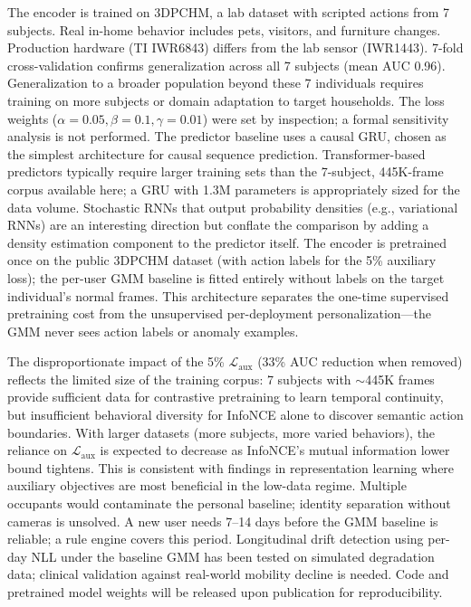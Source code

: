 \documentclass[11pt,a4paper]{article}
\begin{document}
The encoder is trained on 3DPCHM, a lab dataset with scripted actions from 7 subjects. Real in-home behavior includes pets, visitors, and furniture changes. Production hardware (TI IWR6843) differs from the lab sensor (IWR1443).
7-fold cross-validation confirms generalization across all 7 subjects (mean AUC 0.96).
Generalization to a broader population beyond these 7 individuals requires training on more subjects or domain adaptation to target households.
The loss weights ($\alpha{=}0.05, \beta{=}0.1, \gamma{=}0.01$) were set by inspection; a formal sensitivity analysis is not performed.
The predictor baseline uses a causal GRU, chosen as the simplest architecture for causal sequence prediction. Transformer-based predictors typically require larger training sets than the 7-subject, 445K-frame corpus available here; a GRU with 1.3M parameters is appropriately sized for the data volume. Stochastic RNNs that output probability densities (e.g., variational RNNs) are an interesting direction but conflate the comparison by adding a density estimation component to the predictor itself.
The encoder is pretrained once on the public 3DPCHM dataset (with action labels for the 5\% auxiliary loss); the per-user GMM baseline is fitted entirely without labels on the target individual's normal frames.
This architecture separates the one-time supervised pretraining cost from the unsupervised per-deployment personalization---the GMM never sees action labels or anomaly examples.

The disproportionate impact of the 5\% $\mathcal{L}_{\text{aux}}$ (33\% AUC reduction when removed) reflects the limited size of the training corpus: 7 subjects with $\sim$445K frames provide sufficient data for contrastive pretraining to learn temporal continuity, but insufficient behavioral diversity for InfoNCE alone to discover semantic action boundaries.
With larger datasets (more subjects, more varied behaviors), the reliance on $\mathcal{L}_{\text{aux}}$ is expected to decrease as InfoNCE's mutual information lower bound tightens.
This is consistent with findings in representation learning where auxiliary objectives are most beneficial in the low-data regime.
Multiple occupants would contaminate the personal baseline; identity separation without cameras is unsolved.
A new user needs 7--14 days before the GMM baseline is reliable; a rule engine covers this period.
Longitudinal drift detection using per-day NLL under the baseline GMM has been tested on simulated degradation data; clinical validation against real-world mobility decline is needed.
Code and pretrained model weights will be released upon publication for reproducibility.
\end{document}
